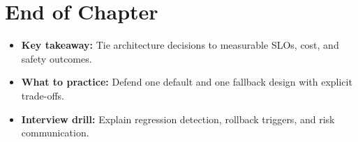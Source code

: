 \section*{End of Chapter}
\begin{itemize}
  \item \textbf{Key takeaway:} Tie architecture decisions to measurable SLOs, cost, and safety outcomes.
  \item \textbf{What to practice:} Defend one default and one fallback design with explicit trade-offs.
  \item \textbf{Interview drill:} Explain regression detection, rollback triggers, and risk communication.
\end{itemize}
